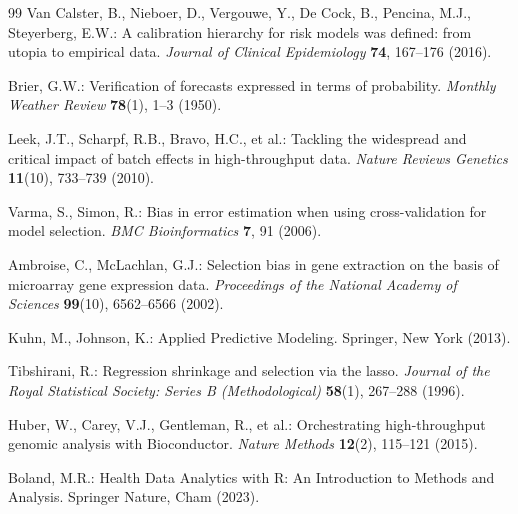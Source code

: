 \documentclass[11pt,twoside,openright]{book}
\begin{document}
\begin{thebibliography}{99}
Van Calster, B., Nieboer, D., Vergouwe, Y., De Cock, B., Pencina, M.J., Steyerberg, E.W.: A calibration hierarchy for risk models was defined: from utopia to empirical data.
\textit{Journal of Clinical Epidemiology} \textbf{74}, 167--176 (2016).

Brier, G.W.: Verification of forecasts expressed in terms of probability.
\textit{Monthly Weather Review} \textbf{78}(1), 1--3 (1950).

Leek, J.T., Scharpf, R.B., Bravo, H.C., et al.: Tackling the widespread and critical impact of batch effects in high-throughput data.
\textit{Nature Reviews Genetics} \textbf{11}(10), 733--739 (2010).

Varma, S., Simon, R.: Bias in error estimation when using cross-validation for model selection.
\textit{BMC Bioinformatics} \textbf{7}, 91 (2006).

Ambroise, C., McLachlan, G.J.: Selection bias in gene extraction on the basis of microarray gene expression data.
\textit{Proceedings of the National Academy of Sciences} \textbf{99}(10), 6562--6566 (2002).

Kuhn, M., Johnson, K.: Applied Predictive Modeling.
Springer, New York (2013).

Tibshirani, R.: Regression shrinkage and selection via the lasso.
\textit{Journal of the Royal Statistical Society: Series B (Methodological)} \textbf{58}(1), 267--288 (1996).

Huber, W., Carey, V.J., Gentleman, R., et al.: Orchestrating high-throughput genomic analysis with Bioconductor.
\textit{Nature Methods} \textbf{12}(2), 115--121 (2015).

Boland, M.R.: Health Data Analytics with R: An Introduction to Methods and Analysis.
Springer Nature, Cham (2023).

\end{thebibliography}
\end{document}
